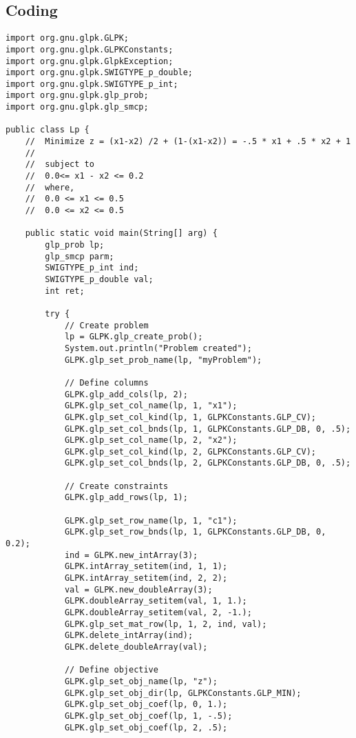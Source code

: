 \documentclass[a4paper,11pt]{report}
\begin{document}
\subsection{Coding}
\begin{lstlisting}
import org.gnu.glpk.GLPK;
import org.gnu.glpk.GLPKConstants;
import org.gnu.glpk.GlpkException;
import org.gnu.glpk.SWIGTYPE_p_double;
import org.gnu.glpk.SWIGTYPE_p_int;
import org.gnu.glpk.glp_prob;
import org.gnu.glpk.glp_smcp;

public class Lp {
    //	Minimize z = (x1-x2) /2 + (1-(x1-x2)) = -.5 * x1 + .5 * x2 + 1
    //
    //	subject to
    //	0.0<= x1 - x2 <= 0.2
    //	where,
    //	0.0 <= x1 <= 0.5
    //	0.0 <= x2 <= 0.5

    public static void main(String[] arg) {
        glp_prob lp;
        glp_smcp parm;
        SWIGTYPE_p_int ind;
        SWIGTYPE_p_double val;
        int ret;

        try {
            // Create problem
            lp = GLPK.glp_create_prob();
            System.out.println("Problem created");
            GLPK.glp_set_prob_name(lp, "myProblem");

            // Define columns
            GLPK.glp_add_cols(lp, 2);
            GLPK.glp_set_col_name(lp, 1, "x1");
            GLPK.glp_set_col_kind(lp, 1, GLPKConstants.GLP_CV);
            GLPK.glp_set_col_bnds(lp, 1, GLPKConstants.GLP_DB, 0, .5);
            GLPK.glp_set_col_name(lp, 2, "x2");
            GLPK.glp_set_col_kind(lp, 2, GLPKConstants.GLP_CV);
            GLPK.glp_set_col_bnds(lp, 2, GLPKConstants.GLP_DB, 0, .5);

            // Create constraints
            GLPK.glp_add_rows(lp, 1);

            GLPK.glp_set_row_name(lp, 1, "c1");
            GLPK.glp_set_row_bnds(lp, 1, GLPKConstants.GLP_DB, 0, 0.2);
            ind = GLPK.new_intArray(3);
            GLPK.intArray_setitem(ind, 1, 1);
            GLPK.intArray_setitem(ind, 2, 2);
            val = GLPK.new_doubleArray(3);
            GLPK.doubleArray_setitem(val, 1, 1.);
            GLPK.doubleArray_setitem(val, 2, -1.);
            GLPK.glp_set_mat_row(lp, 1, 2, ind, val);
            GLPK.delete_intArray(ind);
            GLPK.delete_doubleArray(val);

            // Define objective
            GLPK.glp_set_obj_name(lp, "z");
            GLPK.glp_set_obj_dir(lp, GLPKConstants.GLP_MIN);
            GLPK.glp_set_obj_coef(lp, 0, 1.);
            GLPK.glp_set_obj_coef(lp, 1, -.5);
            GLPK.glp_set_obj_coef(lp, 2, .5);


\end{lstlisting}
\end{document}
